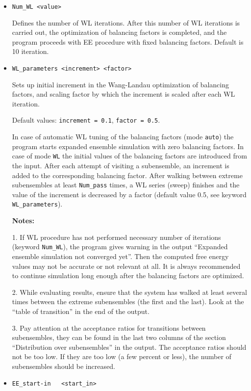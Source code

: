 \documentclass{article}
\begin{document}
\begin{itemize}
\item
\verb|Num_WL <value>| 

Defines the number of WL iterations. After this number of WL iterations 
is carried out, the optimization of balancing factors is completed,
and the program proceeds with EE procedure with fixed balancing factors. 
Default is 10 iteration.

\item
\verb|WL_parameters <increment> <factor>|

Sets up initial increment in the Wang-Landau optimization 
of balancing factors, and scaling factor by which the increment is scaled 
after each WL iteration.

Default values: \verb|increment = 0.1|, \verb|factor = 0.5|.

In case of automatic WL tuning of the balancing factors (mode \verb|auto|)
the program starts expanded ensemble simulation with zero balancing factors. 
In case of mode \verb|WL| the initial values of the balancing factors are
introduced from the input. After each attempt of visiting 
a subensemble, an increment is added to the corresponding balancing factor. 
After walking between extreme subensembles at least \verb|Num_pass| times,
a WL series (sweep) finishes and the value of the increment is decreased by 
a factor (default value 0.5, see keyword \verb|WL_parameters|). 

{\bf Notes:} 

1. If WL procedure has not performed necessary number of iterations
(keyword \verb|Num_WL|), the program gives warning in the output
``Expanded ensemble simulation not converged yet''. Then the computed 
free energy values may not be accurate or not relevant at all.
It is always recommended to continue simulation long enough after the
balancing factors are optimized. 

2. While evaluating results, ensure that the system has walked at least 
several times between the extreme subensembles (the first and the last).
Look at the ``table of transition'' in the end of the output.

3. Pay attention at the acceptance ratios for transitions between subensembles,
they can be found in the last two columns of the section ``Distribution 
over subensembles'' in the output. The acceptance ratios should not be too low.
If they are too low (a few percent or less), the number of subensembles 
should be increased.

\item
\verb|EE_start-in   <start_in>|


\end{itemize}
\end{document}

